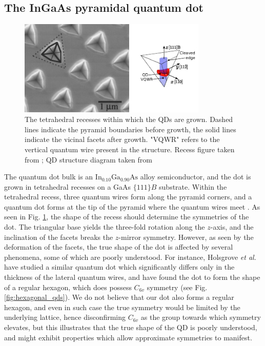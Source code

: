 \documentclass[12pt]{article}
\begin{document}
\subsection{The InGaAs pyramidal quantum dot} \label{sec:growth}
\begin{figure}
\begin{center}

    \includegraphics[width=0.8\textwidth]{figures/pyramidal_qds}
 \caption{The tetrahedral recesses within which the QDs are grown. Dashed lines indicate the pyramid boundaries before growth, the solid lines indicate the vicinal facets after growth. "VQWR" refers to the vertical quantum wire present in the structure. Recess figure taken from \cite[Fig. 1]{pyramidal_qds}; QD structure diagram taken from \cite[Fig. 1]{karlsson}\label{fig:pyramidal_qds}}
\end{center}
\end{figure}

The quantum dot bulk is an $\text{In}_{0.10}\text{Ga}_{0.90}\text{As}$ alloy semiconductor, and the dot is grown in tetrahedral recesses on a GaAs $\{111\}B$ substrate. Within the tetrahedral recess, three quantum wires form along the pyramid corners, and a quantum dot forms at the tip of the pyramid where the quantum wires meet \cite{pyramidal_qds}. As seen in Fig. \ref{fig:pyramidal_qds}, the shape of the recess should determine the symmetries of the dot. The triangular base yields the three-fold rotation along the $z$-axis, and the inclination of the facets breaks the $z$-mirror symmetry. However, as seen by the deformation of the facets, the true shape of the dot is affected by several phenomena, some of which are poorly understood. For instance, Holsgrove \textit{et al.} have studied a similar quantum dot which significantly differs only in the thickness of the lateral quantum wires, and have found the dot to form the shape of a regular hexagon, which does possess $C_{6v}$ symmetry \cite{hexagon} (see Fig. \ref{fig:hexagonal_qds}). We do not believe that our dot also forms a regular hexagon, and even in such case the true symmetry would be limited by the underlying lattice, hence disconfirming $C_{6v}$ as the group towards which symmetry elevates, but this illustrates that the true shape of the QD is poorly understood, and might exhibit properties which allow approximate symmetries to manifest.
\end{document}
